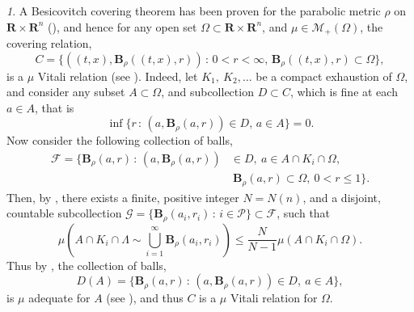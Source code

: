 \documentclass{article}
\theoremstyle{plain}
\theoremstyle{definition}
\theoremstyle{plain}
\theoremstyle{remark}
\newtheorem{propparagraph}[theorem]{}
\theoremstyle{remark}
\theoremstyle{plain}
\begin{document}
\begin{propparagraph}\label{proppara: parabolic Besicovitch}
    A Besicovitch covering theorem has been proven for the parabolic metric $\rho$ on $\mathbf{R} \times \mathbf{R}^{n}$ (\cite[1.1]{Itoh-ParabolicBesicovitch}), and hence for any open set $\Omega \subset \mathbf{R} \times \mathbf{R}^{n}$, and $\mu \in \mathscr{M}_{+} (\Omega)$, the covering relation, 
    \begin{equation*}
        C = \{ ((t, x), \mathbf{B}_{\rho} ((t, x), r)) \, \colon \, 0 < r < \infty, \, \mathbf{B}_{\rho} ((t, x), r) \subset \Omega \}, 
    \end{equation*}
    is a $\mu$ Vitali relation (see \cite[2.9.16]{MR41:1976}).
    Indeed, let $K_{1}, \ K_{2}, \ldots$ be a compact exhaustion of $\Omega$, and consider any subset $A \subset \Omega$, and subcollection $D \subset C$, which is fine at each $a \in A$, that is
    \begin{equation*}
        \textstyle \inf \{ r \, \colon \, (a, \mathbf{B}_{\rho} (a, r)) \in D, \, a \in A \} = 0.
    \end{equation*}
    Now consider the following collection of balls, 
    \begin{equation*}
    \begin{split}
        \textstyle \mathscr{F} = \{ \mathbf{B}_{\rho} (a, r) \, \colon \, (a, \mathbf{B}_{\rho} (a, r)) & \in D, \ a \in A \cap K_{i} \cap \Omega, \\
        & \ \mathbf{B}_{\rho} (a, r) \subset \Omega, \ 0 < r \leq 1\}.
    \end{split}
    \end{equation*}
    Then, by \cite[1.1]{Itoh-ParabolicBesicovitch}, there exists a finite, positive integer $N = N (n)$, and a disjoint, countable subcollection $\mathscr{G} = \{ \mathbf{B}_{\rho} (a_{i}, r_{i}) \, \colon \, i \in \mathscr{P} \} \subset \mathscr{F}$, such that
    \begin{equation*}
        \textstyle \mu \left( A \cap K_{i} \cap \Lambda \sim \bigcup_{i = 1}^{\infty} \mathbf{B}_{\rho} (a_{i}, r_{i}) \right) \leq \frac{N}{N - 1} \mu (A \cap K_{i} \cap \Omega).
    \end{equation*}
    Thus by \cite[2.8.2]{MR41:1976}, the collection of balls, 
    \begin{equation*}
        \textstyle D (A) = \{ \mathbf{B}_{\rho} (a, r) \, \colon \, (a, \mathbf{B}_{\rho} (a, r)) \in D, \ a \in A \},
    \end{equation*}
    is $\mu$ adequate for $A$ (see \cite[2.8.1]{MR41:1976}), and thus $C$ is a $\mu$ Vitali relation for $\Omega$.
    

\end{propparagraph}
\end{document}
